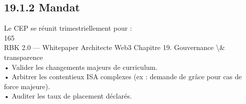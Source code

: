 \documentclass[12pt,landscape,a4paper]{article}
\begin{document}
\subsection{19.1.2 Mandat}
Le CEP se réunit trimestriellement pour :\\
\vspace{0.5em}
\vspace{0.5em}
165\\
RBK 2.0 — Whitepaper Architecte Web3                                                             Chapitre 19. Gouvernance \textbackslash{}& transparence\\
\vspace{0.5em}
\vspace{0.5em}
• Valider les changements majeurs de curriculum.\\
\vspace{0.5em}
• Arbitrer les contentieux ISA complexes (ex : demande de grâce pour cas de force majeure).\\
\vspace{0.5em}
• Auditer les taux de placement déclarés.\\
\vspace{0.5em}
\vspace{0.5em}
\end{document}
